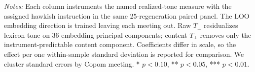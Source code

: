 \begin{table}[htbp]
\begin{threeparttable}
\begin{scriptsize}
\begin{tablenotes}[flushleft]
\scriptsize
\item \textit{Notes:} Each column instruments the named realized-tone measure with the assigned hawkish instruction in the same 25-regeneration paired panel. The LOO embedding direction is trained leaving each meeting out. Raw $T_{\perp}$ residualizes lexicon tone on 36 embedding principal components; content $T_{\perp}$ removes only the instrument-predictable content component. Coefficients differ in scale, so the effect per one within-sample standard deviation is reported for comparison. We cluster standard errors by Copom meeting. * $p<0.10$, ** $p<0.05$, *** $p<0.01$.
\end{tablenotes}
\end{scriptsize}
\end{threeparttable}
\end{table}
